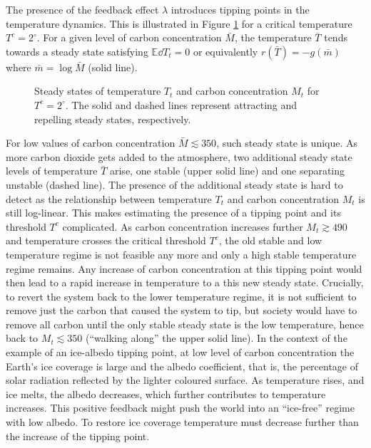 \documentclass[../../main.tex]{subfiles}
\begin{document}
The presence of the feedback effect $\lambda$ introduces tipping points in the temperature dynamics. This is illustrated in Figure \ref{fig:bare-nullclines} for a critical temperature $T^c = 2^\circ$. For a given level of carbon concentration $\bar{M}$, the temperature $\bar{T}$ tends towards a steady state satisfying $\mathbb{E} \dd{T}_t = 0$ or equivalently $r(\bar{T}) = - g(\bar{m})$ where $\bar{m} = \log \bar{M}$ (solid line). \begin{figure}[H]
    \centering
    
    \caption{Steady states of temperature $T_t$ and carbon concentration $M_t$ for $T^c = 2^\circ$. The solid and dashed lines represent attracting and repelling steady states, respectively.}
    \label{fig:bare-nullclines}
\end{figure} \noindent For low values of carbon concentration $\bar{M} \lesssim 350$, such steady state is unique. As more carbon dioxide gets added to the atmosphere, two additional steady state levels of temperature $\bar{T}$ arise, one stable (upper solid line) and one separating unstable (dashed line). The presence of the additional steady state is hard to detect as the relationship between temperature $T_t$ and carbon concentration $M_t$ is still log-linear. This makes estimating the presence of a tipping point and its threshold $T^c$ complicated. As carbon concentration increases further $M_t \gtrsim 490$ and temperature crosses the critical threshold $T^c$, the old stable and low temperature regime is not feasible any more and only a high stable temperature regime remains. Any increase of carbon concentration at this tipping point would then lead to a rapid increase in temperature to a this new steady state. Crucially, to revert the system back to the lower temperature regime, it is not sufficient to remove just the carbon that caused the system to tip, but society would have to remove all carbon until the only stable steady state is the low temperature, hence back to $M_t \lesssim 350$ (``walking along'' the upper solid line). In the context of the example of an ice-albedo tipping point, at low level of carbon concentration the Earth's ice coverage is large and the albedo coefficient, that is, the percentage of solar radiation reflected by the lighter coloured surface. As temperature rises, and ice melts, the albedo decreases, which further contributes to temperature increases. This positive feedback might push the world into an ``ice-free'' regime with low albedo. To restore ice coverage temperature must decrease further than the increase of the tipping point.
\end{document}
